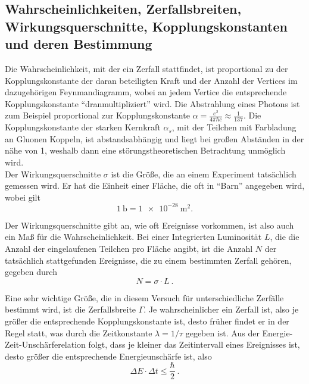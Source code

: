 \documentclass[a4paper,ngerman]{scrartcl}
\begin{document}
\subsection{Wahrscheinlichkeiten, Zerfallsbreiten, Wirkungsquerschnitte, Kopplungskonstanten und deren Bestimmung}
\label{sec:zerfallsbreiten}
Die Wahrscheinlichkeit, mit der ein Zerfall stattfindet, 
ist proportional zu der Kopplungskonstante der daran beteiligten Kraft und der Anzahl der Vertices im
dazugehörigen Feynmandiagramm, wobei an jedem Vertice die entsprechende Kopplungskonstante "`dranmultipliziert"' wird.
Die Abstrahlung eines Photons ist zum Beispiel proportional zur Kopplungskonstante $\alpha = \frac{e^2}{4 \pi\hbar c} \approx \frac{1}{137}$.
Die Kopplungskonstante der starken Kernkraft $\alpha_s$, mit der Teilchen mit Farbladung an Gluonen Koppeln, ist abstandsabhängig und liegt bei großen Abständen in der nähe von 1, weshalb dann eine störungstheoretischen Betrachtung unmöglich wird.\\

Der Wirkungsquerschnitte $\sigma$ ist die Größe, die an einem Experiment tatsächlich gemessen wird.
Er hat die Einheit einer Fläche, die oft in "`Barn"' angegeben wird, wobei gilt
\begin{equation}
  \SI{1}{\barn} = \SI{1e-28}{\meter\squared}.
\end{equation}

Der Wirkungsquerschnitte gibt an, wie oft Ereignisse vorkommen, ist also auch ein Maß für die Wahrscheinlichkeit.
Bei einer Integrierten Luminosität $L$, die die Anzahl der eingelaufenen Teilchen pro Fläche angibt,
ist die Anzahl $N$ der tatsächlich stattgefunden Ereignisse, die zu einem bestimmten Zerfall gehören, gegeben durch
\begin{equation}
  N = \sigma \cdot L~.
\end{equation}

Eine sehr wichtige Größe, die in diesem Versuch für unterschiedliche Zerfälle bestimmt wird, ist die Zerfallsbreite $\Gamma$.
Je wahrscheinlicher ein Zerfall ist, also je größer die entsprechende Kopplungskonstante ist, 
desto früher findet er in der Regel statt, was durch die Zeitkonstante $\lambda = 1/\tau$ gegeben ist.
Aus der Energie-Zeit-Unschärferelation folgt, dass je kleiner das Zeitintervall eines Ereignisses ist,
desto größer die entsprechende Energieunschärfe ist, also
\begin{equation}
  \Delta E \cdot \Delta t \leq \frac{\hbar}{2}~.
\end{equation}
\end{document}

